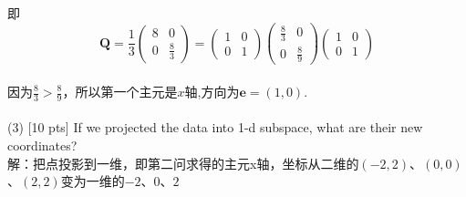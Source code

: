 \documentclass{article}
\begin{document}
即\begin{equation}       
\bm{Q}=\frac{1}{3}\left(                 
  \begin{array}{ccc}   
   8 &  0\\  
     0 &  \frac{8}{3}
  \end{array}
\right)=\left(                 
  \begin{array}{ccc}   
   1 &  0\\  
     0 &  1
  \end{array}
\right)\left(                 
  \begin{array}{ccc}   
   \frac{8}{3} &  0\\  
     0 &  \frac{8}{9}
  \end{array}
\right) \left(                 
  \begin{array}{ccc}   
   1 &  0\\  
     0 &  1
  \end{array}
\right)      
\end{equation}\\
因为$\frac{8}{3}>\frac{8}{9}$，所以第一个主元是$x$轴,方向为$\bm{e}=(1,0)$.\\\\
(3) [10 pts] If we projected the data into 1-d subspace, what are their new coordinates?\\
解：把点投影到一维，即第二问求得的主元x轴，坐标从二维的$(-2, 2)$、$(0, 0)$、$(2, 2)$变为一维的$-2$、$0$、$2$
\end{document}
